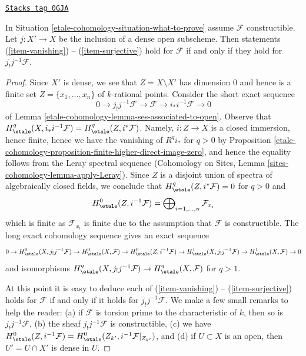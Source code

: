 \begin{lemma}
\label{etale-cohomology-lemma-restrict-to-open}
\href{https://stacks.math.columbia.edu/tag/0GJA}{\texttt{Stacks tag 0GJA}}

In Situation \ref{etale-cohomology-situation-what-to-prove} assume $\mathcal{F}$
constructible. Let $j : X' \to X$ be the inclusion of a dense open subscheme.
Then statements
(\ref{item-vanishing}) -- (\ref{item-surjective}) hold for $\mathcal{F}$
if and only if they hold for $j_!j^{-1}\mathcal{F}$.
\end{lemma}

\begin{proof}
Since $X'$ is dense, we see that $Z = X \setminus X'$ has dimension $0$
and hence is a finite set $Z = \{x_1, \ldots, x_n\}$ of $k$-rational points.
Consider the short exact sequence
$$
0 \to j_!j^{-1}\mathcal{F} \to \mathcal{F} \to i_*i^{-1}\mathcal{F} \to 0
$$
of Lemma \ref{etale-cohomology-lemma-ses-associated-to-open}. Observe that
$H^q_\etale(X, i_*i^{-1}\mathcal{F}) = H^q_\etale(Z, i^*\mathcal{F})$.
Namely, $i : Z \to X$ is a closed immersion, hence finite,
hence we have the vanishing of $R^qi_*$ for $q > 0$ by
Proposition \ref{etale-cohomology-proposition-finite-higher-direct-image-zero}, and
hence the equality follows from the Leray spectral sequence
(Cohomology on Sites, Lemma \ref{sites-cohomology-lemma-apply-Leray}).
Since $Z$ is a disjoint union of spectra of algebraically closed
fields, we conclude that $H^q_\etale(Z, i^*\mathcal{F}) = 0$
for $q > 0$ and
$$
H^0_\etale(Z, i^{-1}\mathcal{F}) =
\bigoplus\nolimits_{i = 1, \ldots, n} \mathcal{F}_{x_i}
$$
which is finite as $\mathcal{F}_{x_i}$ is finite due to the
assumption that $\mathcal{F}$ is constructible.
The long exact cohomology sequence gives an exact sequence
$$
0 \to
H^0_\etale(X, j_!j^{-1}\mathcal{F}) \to
H^0_\etale(X, \mathcal{F}) \to
H^0_\etale(Z, i^{-1}\mathcal{F}) \to
H^1_\etale(X, j_!j^{-1}\mathcal{F}) \to
H^1_\etale(X, \mathcal{F}) \to 0
$$
and isomorphisms $H^q_\etale(X, j_!j^{-1}\mathcal{F}) \to
H^q_\etale(X, \mathcal{F})$ for $q > 1$.

\medskip\noindent
At this point it is easy to deduce each of
(\ref{item-vanishing}) -- (\ref{item-surjective})
holds for $\mathcal{F}$ if and only if it holds for
$j_!j^{-1}\mathcal{F}$. We make a few small remarks to help the reader:
(a) if $\mathcal{F}$ is torsion prime to the characteristic
of $k$, then so is $j_!j^{-1}\mathcal{F}$,
(b) the sheaf $j_!j^{-1}\mathcal{F}$ is constructible,
(c) we have $H^0_\etale(Z, i^{-1}\mathcal{F}) =
H^0_\etale(Z_{k'}, i^{-1}\mathcal{F}|_{Z_{k'}})$, and (d)
if $U \subset X$ is an open, then $U' = U \cap X'$ is dense in $U$.
\end{proof}

